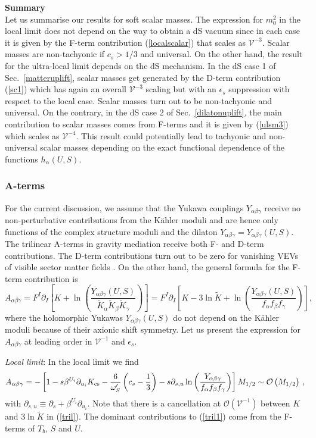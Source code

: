 \documentclass[11pt,a4paper]{article}
\newcommand{\be}{\begin{equation}}
\newcommand{\ee}{\end{equation}}
\newcommand\vo{{\mathcal{V}}}
\newcommand{\mc}{\mathcal}
\begin{document}
\noindent \textbf{Summary}
\medskip\\
Let us summarise our results for soft scalar masses.
The expression for $m_0^2$ in the local limit does not depend on the way to obtain a dS vacuum since in each case
it is given by the F-term contribution (\ref{localscalar}) that scales as $\vo^{-3}$. Scalar masses are non-tachyonic if $c_s>1/3$ and universal.
On the other hand, the result for the ultra-local limit depends on the dS mechanism.
In the dS case 1 of Sec.~\ref{matteruplift}, scalar masses get generated by the D-term contribution (\ref{sc1}) which has again an overall $\vo^{-3}$ scaling but with an $\epsilon_s$ suppression with respect to the local case. Scalar masses turn out to be non-tachyonic and universal.
On the contrary, in the dS case 2 of Sec.~\ref{dilatonuplift}, the main contribution to scalar masses comes from F-terms and it is given by (\ref{ulsm3}) which scales as $\vo^{-4}$. This result could potentially lead to tachyonic and non-universal scalar masses depending on the exact functional dependence of the functions $h_\alpha(U,S)$.

\subsubsection{A-terms}

For the current discussion, we assume that the Yukawa couplings $Y_{\alpha \beta \gamma}$ receive no non-perturbative contributions from the K\"ahler moduli and are hence only functions of the complex structure moduli and the dilaton $Y_{\alpha \beta \gamma}=Y_{\alpha \beta \gamma}(U,S)$. The trilinear A-terms in gravity mediation receive both F- and D-term contributions. The D-term contributions turn out to be zero for vanishing VEVs of visible sector matter fields \cite{Dudas:2005vv}. On the other hand, the general formula for the F-term contribution is \cite{Brignole:1993dj}
\be
\label{tril}
A_{\alpha\beta\gamma} = F^I \partial_I
\left[K + \ln \left(\frac{Y_{\alpha \beta \gamma}(U,S)}{\tilde{K}_\alpha \tilde{K}_\beta \tilde{K}_\gamma}\right)\right]
= F^I \partial_I
\left[K -3\ln\tilde{K}+ \ln \left(\frac{Y_{\alpha \beta \gamma}(U,S)}{f_\alpha f_\beta f_\gamma}\right)\right],
\ee
where the holomorphic Yukawas $Y_{\alpha \beta \gamma}(U,S)$ do not depend on the K\"ahler moduli because of their axionic shift symmetry.
Let us present the expression for $A_{\alpha\beta\gamma}$ at leading order in $\vo^{-1}$ and $\epsilon_s$.

\medskip
\emph{Local limit}: In the local limit we find
\be
\label{tril1}
A_{\alpha\beta\gamma}= - \left[1 -s\beta^{U_i}\partial_{u_i} K_{\rm cs} - \frac{6}{\omega'_S}\left(c_s-\frac 13\right)
- s \partial_{s,u} \ln \left(\frac{Y_{\alpha \beta \gamma}}{f_\alpha f_\beta f_\gamma} \right) \right] M_{1/2}\sim\mc{O}\left(M_{1/2}\right)\,,
\ee
with $\partial_{s,u}\equiv \partial_s+\beta^{U_i}\partial_{u_i}$.
Note that there is a cancellation at $\mc{O}(\vo^{-1})$ between $K$ and $3\ln\tilde{K}$ in (\ref{tril}).
The dominant contributions to (\ref{tril1}) come from the F-terms of $T_b$, $S$ and $U$.
\end{document}
